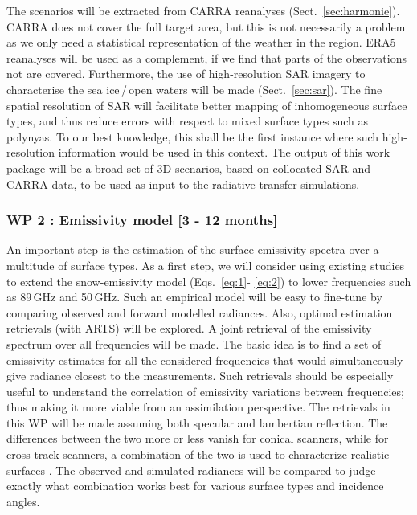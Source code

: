 \documentclass[12pt,oneside,a4paper]{article}
\begin{document}
\label{sec:atmscenes}
The scenarios will be extracted from CARRA reanalyses
(Sect.~\ref{sec:harmonie}). CARRA does not cover the full target area, but this
is not necessarily a problem as we only need a statistical representation of
the weather in the region. ERA5 reanalyses will be used as a complement, if we
find that parts of the observations not are covered. Furthermore, the use of
high-resolution SAR imagery to characterise the sea ice\,/\,open waters will be
made (Sect.~\ref{sec:sar}). The fine spatial resolution of SAR will
facilitate better mapping of inhomogeneous surface types, and thus reduce
errors with respect to mixed surface types such as polynyas. To our best
knowledge, this shall be the first instance where such high-resolution
information would be used in this context. The output of this work package will
be a broad set of 3D scenarios, based on collocated SAR and CARRA data, to be
used as input to the radiative transfer simulations. \vspace{-1.0ex}


\subsubsection*{WP 2 : Emissivity model [3 - 12 months]}

%
\label{sec:emissivity}
An important step is the estimation of the surface emissivity spectra over a
multitude of surface types. As a first step, we will consider using existing
studies to extend the snow-emissivity model (Eqs.~\ref{eq:1}- \ref{eq:2})
to lower frequencies such as 89\,GHz and 50\,GHz. Such an empirical model will
be easy to fine-tune by comparing observed and forward modelled radiances. Also,
optimal estimation retrievals (with ARTS) will be explored. A joint retrieval
of the emissivity spectrum over all frequencies will be made. The basic idea is
to find a set of emissivity estimates for all the considered frequencies that
would simultaneously give radiance closest to the measurements. Such retrievals
should be especially useful to understand the correlation of emissivity
variations between frequencies; thus making it more viable from an assimilation
perspective. The retrievals in this WP will be made assuming both specular and
lambertian reflection. The differences between the two more or less vanish for
conical scanners, while for cross-track scanners, a combination of the two is
used to characterize realistic surfaces \citep{matzler:2005:onthe}. The
observed and simulated radiances will be compared to judge exactly what
combination works best for various surface types and incidence angles.
\end{document}
